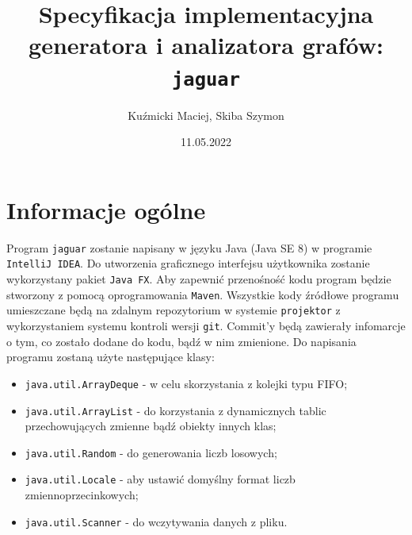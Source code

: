 \documentclass[]{article}
\title{Specyfikacja implementacyjna generatora i analizatora grafów: \texttt{jaguar}}
\author{Kuźmicki Maciej, Skiba Szymon}
\date{11.05.2022}
\begin{document}
\maketitle
\thispagestyle{fancy}
\section{Informacje ogólne}\label{header-n231}
Program \texttt{jaguar} zostanie napisany w języku Java (Java SE 8) w programie \texttt{IntelliJ IDEA}. Do utworzenia graficznego interfejsu użytkownika zostanie wykorzystany pakiet \texttt{Java FX}. Aby zapewnić przenośność kodu program będzie stworzony z pomocą oprogramowania \texttt{Maven}.  Wszystkie kody źródłowe programu umieszczane będą na zdalnym repozytorium w systemie \texttt{projektor} z wykorzystaniem systemu kontroli wersji \texttt{git}. Commit'y będą zawierały infomarcje o tym, co zostało dodane do kodu, bądź w nim zmienione. Do napisania programu zostaną użyte następujące klasy:
\begin{itemize}
\item
\texttt{java.util.ArrayDeque} - w celu skorzystania z kolejki typu FIFO;
\item
\texttt{java.util.ArrayList} - do korzystania z dynamicznych tablic przechowujących zmienne bądź obiekty innych klas;
\item
\texttt{java.util.Random} - do generowania liczb losowych;
\item
\texttt{java.util.Locale} - aby ustawić domyślny format liczb zmiennoprzecinkowych;
\item
\texttt{java.util.Scanner} - do wczytywania danych z pliku.
\end{itemize}
\end{document}
